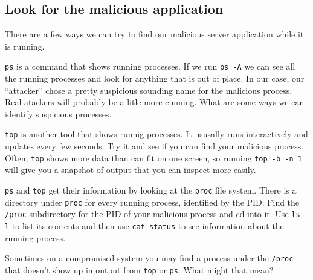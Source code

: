\documentclass{article}
\begin{document}
\subsection{Look for the malicious application}
There are a few ways we can try to find our malicious server application while it is running.

\texttt{ps} is a command that shows running processes. If we run \texttt{ps -A} we can see all the running processes and look for anything that is out of place.  In our case, our ``attacker'' chose a pretty suspicious sounding name for the malicious process.  Real atackers will probably be a litle more cunning. What are some ways we can identify suspicious processes.

\texttt{top} is another tool that shows runnig processes.  It ususally runs interactively and updates every few seconds.  Try it and see if you can find your malicious process.  Often, \texttt{top} shows more data than can fit on one screen, so running \texttt{top -b -n 1} will give you a snapshot of output that you can inspect more easily.

\texttt{ps} and \texttt{top} get their information by looking at the \texttt{proc} file system. There is a directory under \texttt{proc} for every running process, identified by the PID.  Find the \texttt{/proc} subdirectory for the PID of your malicious process and cd into it.  Use \texttt{ls -l} to list its contents and then use \texttt{cat status} to see information about the running process.

Sometimes on a compromised system you may find a process under the \texttt{/proc} that doesn't show up in output from \texttt{top} or \texttt{ps}.  What might that mean?
\end{document}
